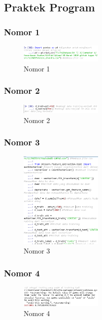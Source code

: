 \subsection{Praktek Program}
\subsubsection{Nomor 1}
\hfill\break

\begin{figure}[H]
\centering
\includegraphics[width=4cm]{figures/1174079/4/soal1.PNG}
\caption{Nomor 1}
\end{figure}

\subsubsection{Nomor 2}
\hfill\break

\begin{figure}[H]
\centering
\includegraphics[width=4cm]{figures/1174079/4/soal2.PNG}
\caption{Nomor 2}
\end{figure}

\subsubsection{Nomor 3}
\hfill\break

\begin{figure}[H]
\centering
\includegraphics[width=4cm]{figures/1174079/4/soal3.PNG}
\caption{Nomor 3}
\end{figure}

\subsubsection{Nomor 4}
\hfill\break

\begin{figure}[H]
\centering
\includegraphics[width=4cm]{figures/1174079/4/soal4.PNG}
\caption{Nomor 4}
\end{figure}

